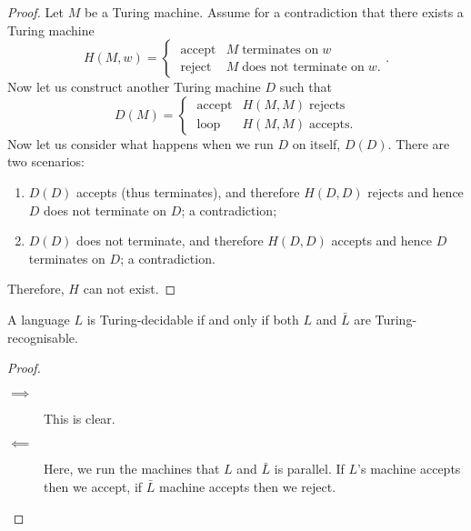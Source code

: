\begin{proof}
    Let $M$ be a Turing machine. Assume for a contradiction that there exists a Turing machine
    \[ 
        H(M, w) = 
        \begin{cases} 
            \;\text{accept} & M \;\text{terminates on}\; w \\
            \;\text{reject} & M \;\text{does not terminate on}\; w.
        \end{cases}.
    \]
    Now let us construct another Turing machine $D$ such that
    \[ 
        D(M) =
        \begin{cases}
            \;\text{accept} & H(M, M) \;\text{rejects} \\
            \;\text{loop}   & H(M, M) \;\text{accepts}.
        \end{cases}
    \]
    Now let us consider what happens when we run $D$ on itself, $D(D)$. There are two scenarios:
    \begin{enumerate}
        \item $D(D)$ accepts (thus terminates), and therefore $H(D, D)$ rejects and hence $D$ does not terminate on $D$; a contradiction;
        \item $D(D)$ does not terminate, and therefore $H(D, D)$ accepts and hence $D$ terminates on $D$; a contradiction.
    \end{enumerate}
    Therefore, $H$ can not exist.
\end{proof}

\begin{theorem}[]
    A language $L$ is Turing-decidable if and only if both $L$ and $\bar L$ are Turing-recognisable.
\end{theorem}

\begin{proof}
    \begin{description}
        \item[$\implies$] This is clear.
        \item[$\impliedby$] Here, we run the machines that $L$ and $\bar L$ is parallel. If $L$'s machine accepts then we accept, if $\bar L$ machine accepts then we reject. 
    \end{description}
\end{proof}
